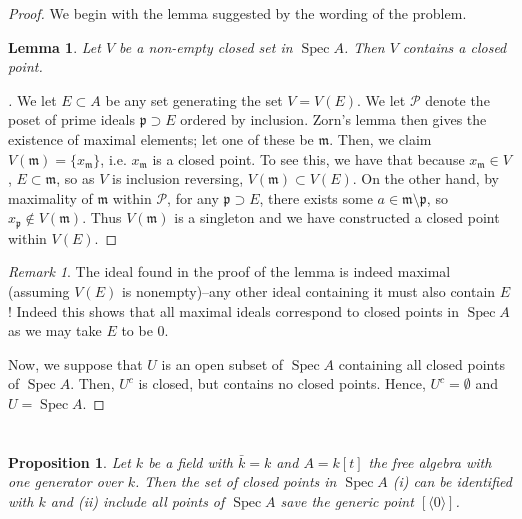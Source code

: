 \documentclass[english]{article}
\DeclareMathOperator{\Spec}{Spec}
\DeclareMathOperator{\spec}{Spec}
\newcommand{\mfr}{\mathfrak{m}}
\newcommand{\pfr}{\mathfrak{p}}
\newenvironment{subproof}[1][\proofname]{%
	\renewcommand{\qedsymbol}{$\blacksquare$}%
	\begin{proof}[#1]%
	}{%
	\end{proof}%
}
\newcommand{\prob}[1]{\setcounter{section}{#1-1}\section{}}
\newtheorem{lemma}[theorem]{Lemma}
\newtheorem*{proposition*}{Proposition}
\theoremstyle{remark}
\newtheorem{remark}{Remark}[section]
\theoremstyle{definition}
\newcommand{\idl}[1]{\langle #1 \rangle}
\begin{document}
\begin{proof}
We begin with the lemma suggested by the wording of the problem.
\begin{lemma}\label{closemax}
	Let $V$ be a non-empty closed set in $\spec A$. Then $V$ contains a closed point.
\end{lemma}
\begin{subproof} We let $E\subset A$ be any set generating the set $V=V(E)$. 
	We let $\mathcal{P}$ denote the poset of prime ideals $\pfr\supset E$ ordered by inclusion. Zorn's lemma then gives the existence of maximal elements; let one of these be $\mfr$. Then, we claim $V(\mfr)=\{x_\mfr\}$, i.e. $x_\mfr$ is a closed point. To see this, we have that because $x_\mfr\in V$, $E\subset \mfr$, so as $V$ is inclusion reversing, $V(\mfr)\subset V(E)$. On the other hand, by maximality of $\mfr$ within $\mathcal{P}$, for any $\pfr\supset E$, there exists some $a\in \mfr\setminus \pfr$, so $x_\pfr\not \in V(\mfr)$. Thus $V(\mfr)$ is a singleton and we have constructed a closed point within $V(E)$.  
\end{subproof}
\begin{remark}\label{max}
	The ideal found in the proof of the lemma is indeed maximal (assuming $V(E)$ is nonempty)--any other ideal containing it must also contain $E$! Indeed this shows that all maximal ideals correspond to closed points in $\spec A$ as we may take $E$ to be $0$.
\end{remark}
Now, we suppose that $U$ is an open subset of $\Spec A$ containing all closed points of $\Spec A$. Then, $U^c$ is closed, but contains no closed points. Hence, $U^c=\emptyset$ and $U=\spec A$. 

\end{proof}
\prob{4}
\begin{proposition*}
	Let $k$ be a field with $\bar k=k$ and $A=k[t]$ the free algebra with one generator over $k$. Then the set of closed points in $\spec A$ \emph{(i)} can be identified with $k$ and \emph{(ii)} include all points of $\spec A$ save the generic point $[\idl{0}]$.
\end{proposition*}
\end{document}
